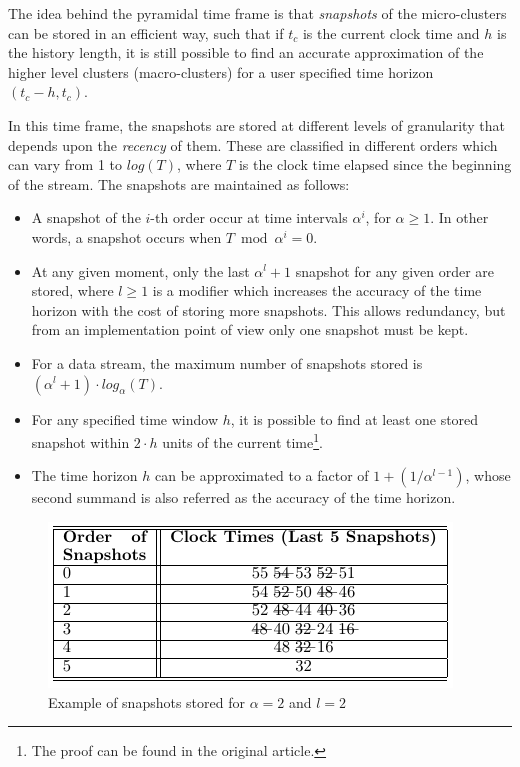 The idea behind the pyramidal time frame is that \textit{snapshots} of the micro-clusters can be stored in an efficient way, such that if $t_c$ is the current clock time and $h$ is the history length, it is still possible to find an accurate approximation of the higher level clusters (macro-clusters) for a user specified time horizon $(t_c - h, t_c)$.

In this time frame, the snapshots are stored at different levels of granularity that depends upon the \textit{recency} of them. These are classified in different orders which can vary from 1 to $log(T)$, where $T$ is the clock time elapsed since the beginning of the stream. The snapshots are maintained as follows:

\begin{itemize}
 \item A snapshot of the $i$-th order occur at time intervals $\alpha^i$, for $\alpha \geq 1$. In other words, a snapshot occurs when $T \bmod \alpha^i = 0$.
 \item At any given moment, only the last $\alpha^l + 1$ snapshot for any given order are stored, where $l \geq 1$ is a modifier which increases the accuracy of the time horizon with the cost of storing more snapshots. This allows redundancy, but from an implementation point of view only one snapshot must be kept.
 \item For a data stream, the maximum number of snapshots stored is $(\alpha^l + 1)\cdot log_{\alpha}(T)$.
 \item For any specified time window $h$, it is possible to find at least one stored snapshot within $2\cdot h$ units of the current time\footnote{The proof can be found in the original article\cite{clustreamOrig}.}.
 \item The time horizon $h$ can be approximated to a factor of $1 + (1/ \alpha^{l-1})$, whose second summand is also referred as the accuracy of the time horizon.
\end{itemize}

\begin{figure}[h!]
 \centering
 \includegraphics[scale=0.75]{./styles/pyramidalFrame.png}
 \caption{Example of snapshots stored for $\alpha = 2$ and $l=2$}
 \label{table:timeFrame}
\end{figure}

